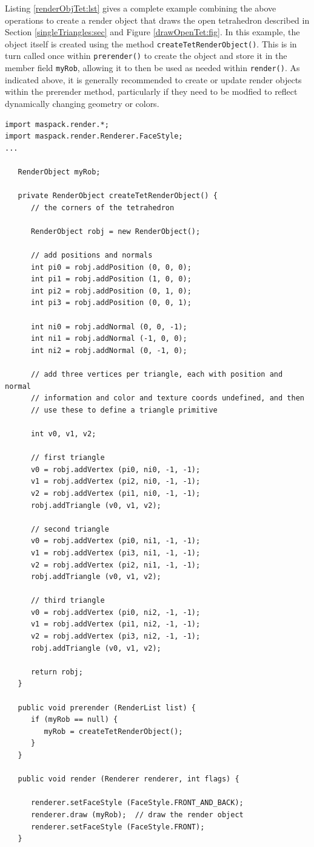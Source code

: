 Listing \ref{renderObjTet:lst} gives a complete example combining the
above operations to create a render object that draws the open
tetrahedron described in Section \ref{singleTriangles:sec} and Figure
\ref{drawOpenTet:fig}. In this example, the object itself is created
using the method {\tt createTetRenderObject()}. This is in turn called
once within {\tt prerender()} to create the object and store it in the
member field {\tt myRob}, allowing it to then be used as needed within
{\tt render()}. As indicated above, it is generally recommended to
create or update render objects within the prerender method,
particularly if they need to be modfied to reflect dynamically
changing geometry or colors.
%
\begin{lstlisting}[caption={Construction and use of a render object to draw
a partial tetrahedron.}, 
label=renderObjTet:lst]
import maspack.render.*;
import maspack.render.Renderer.FaceStyle;
...

   RenderObject myRob;
   
   private RenderObject createTetRenderObject() {
      // the corners of the tetrahedron
      
      RenderObject robj = new RenderObject();
   
      // add positions and normals
      int pi0 = robj.addPosition (0, 0, 0);
      int pi1 = robj.addPosition (1, 0, 0);
      int pi2 = robj.addPosition (0, 1, 0);
      int pi3 = robj.addPosition (0, 0, 1);
   
      int ni0 = robj.addNormal (0, 0, -1);
      int ni1 = robj.addNormal (-1, 0, 0);
      int ni2 = robj.addNormal (0, -1, 0);
   
      // add three vertices per triangle, each with position and normal
      // information and color and texture coords undefined, and then
      // use these to define a triangle primitive
   
      int v0, v1, v2;
   
      // first triangle
      v0 = robj.addVertex (pi0, ni0, -1, -1);
      v1 = robj.addVertex (pi2, ni0, -1, -1);
      v2 = robj.addVertex (pi1, ni0, -1, -1);
      robj.addTriangle (v0, v1, v2);
   
      // second triangle
      v0 = robj.addVertex (pi0, ni1, -1, -1);
      v1 = robj.addVertex (pi3, ni1, -1, -1);
      v2 = robj.addVertex (pi2, ni1, -1, -1);
      robj.addTriangle (v0, v1, v2);
   
      // third triangle
      v0 = robj.addVertex (pi0, ni2, -1, -1);
      v1 = robj.addVertex (pi1, ni2, -1, -1);
      v2 = robj.addVertex (pi3, ni2, -1, -1);
      robj.addTriangle (v0, v1, v2);
   
      return robj;
   }
   
   public void prerender (RenderList list) {
      if (myRob == null) {
         myRob = createTetRenderObject();
      }
   }
         
   public void render (Renderer renderer, int flags) {
   
      renderer.setFaceStyle (FaceStyle.FRONT_AND_BACK); 
      renderer.draw (myRob);  // draw the render object
      renderer.setFaceStyle (FaceStyle.FRONT); 
   }
\end{lstlisting}


